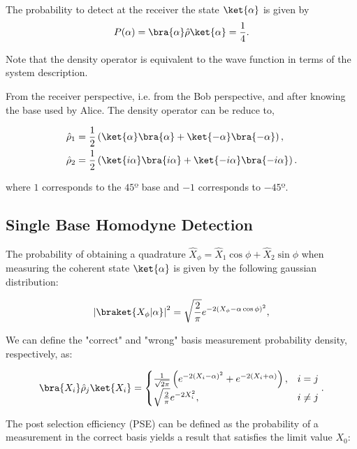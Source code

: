 \documentclass[../../sdf/tex/cv_system]{subfiles}
\begin{document}
The probability to detect at the receiver the state $\ket{\alpha}$ is given by
\begin{equation}\label{eq:statedensity}
P(\alpha)=\bra{\alpha}\hat{\rho}\ket{\alpha}=\frac{1}{4}.
\end{equation}


Note that the density operator is equivalent to the wave function in terms of the system description.

From the receiver perspective, i.e. from the Bob perspective, and after knowing the base used by Alice.
The density operator can be reduce to,

\begin{align}
\hat{\rho}_1&=\frac{1}{2}\left(\ket{\alpha}\bra{\alpha}+\ket{-\alpha}\bra{-\alpha}\right),\label{eq:statedensity1} \\
\hat{\rho}_2&=\frac{1}{2}\left(\ket{i\alpha}\bra{i\alpha}+\ket{-i\alpha}\bra{-i\alpha}\right).\label{eq:statedensity2}
\end{align}

where $1$ corresponds to the $45º$ base and $-1$ corresponds to $-45º$.

\subsection{Single Base Homodyne Detection}


The probability of obtaining a quadrature $\hat{X}_\phi=\hat{X}_1\cos\phi+\hat{X}_2\sin\phi$ when measuring the coherent state $\ket{\alpha}$ is given by the following gaussian distribution:

\begin{equation}
\left|\braket{X_\phi|\alpha}\right|^2=\sqrt{\frac{2}{\pi}}e^{-2(X_\phi-\alpha\cos\phi)^2},
\end{equation}

We can define the "correct" and "wrong" basis measurement probability density, respectively, as:

\begin{equation}\label{eq:probdensity}
\bra{X_i}\hat{\rho}_j\ket{X_i}=
\begin{cases}
\frac{1}{\sqrt{2\pi}}\left(e^{-2(X_i-\alpha)^2}+e^{-2(X_i+\alpha)}\right), & i=j\\
\sqrt{\frac{2}{\pi}}e^{-2X_i^2}, &i\neq j
\end{cases}.
\end{equation}

The post selection efficiency (PSE) can be defined as the probability of a measurement in the correct basis yields a result that satisfies the limit value $X_0$:
\end{document}
